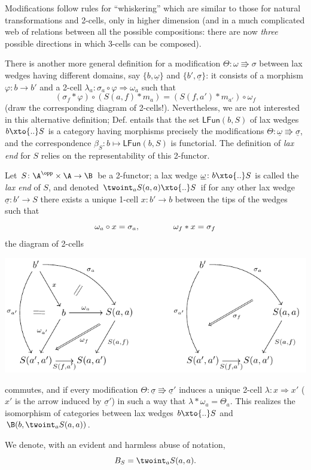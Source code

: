 Modifications follow rules for ``whiskering'' which are similar to those for natural transformations and 2-cells, only in higher dimension (and in a much complicated web of relations between all the possible compositions: there are now \emph{three} possible directions in which 3-cells can be composed).
\begin{remark}
There is another more general definition for a modification $\Theta\colon \omega\Rrightarrow\sigma$ between lax wedges having different domains, say $\{b, \underline{\omega}\}$ and $\{b', \underline\sigma\}$: it consists of a morphism $\varphi\colon b\to b'$ and a 2-cell $\lambda_a\colon \sigma_a \circ\varphi \Rightarrow \omega_a$ such that
\[
(\sigma_f * \varphi)\circ (S(a,f) * m_a) = (S(f, a') * m_{a'})\circ \omega_f
\]
(draw the corresponding diagram of 2-cells!). Nevertheless, we are not interested in this alternative definition; Def\@.  entails that the set $\textsf{LFun}(b, S)$ of lax wedges $b\xto{..}S$ is a category having morphisms precisely the modifications $\Theta\colon \underline\omega\Rrightarrow \underline\sigma$, and the correspondence $\beta_S\colon b\mapsto \textsf{LFun}(b,S)$ is functorial. The definition of \emph{lax end} for $S$ relies on the representability of this 2-functor.
\end{remark}
\begin{definition}
Let $S\colon \A^\opp\times \A \to \B$ be a 2-functor; a lax wedge $\underline\omega\colon b\xto{..} S$ is called the \emph{lax end} of $S$, and denoted $\twoint_a S(a,a) \xto{..} S$ if for any other lax wedge $\underline\sigma\colon b'\to S$ there exists a unique 1-cell $x\colon b'\to b$ between the tips of the wedges such that
\[
\omega_a \circ x = \sigma_a, \notag\qquad\qquad
\omega_f * x = \sigma_f
\]
\ie the diagram of 2-cells
\begin{center}
\includegraphics[scale=1]{figures/fig18}
\end{center}
commutes, and if every modification $\Theta\colon \underline\sigma\Rrightarrow \underline\sigma'$ induces a unique 2-cell $\lambda\colon x\Rightarrow x'$ ($x'$ is the arrow induced by $\underline\sigma'$) in such a way that
$\lambda * \omega_a = \Theta_a$. This realizes the isomorphism of categories between lax wedges $b \xto{..} S$ and $\B(b, \twoint_a S(a,a))$.

We denote, with an evident and harmless abuse of notation, \[
B_S = \twoint_a S(a,a).
\]
\end{definition}
